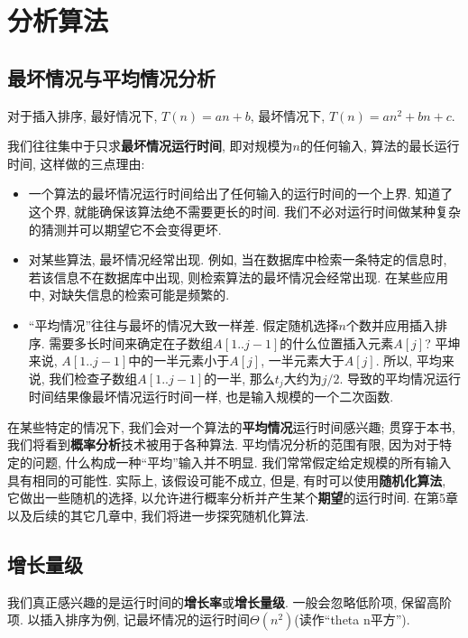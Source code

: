 \documentclass[UTF8,a4paper,zihao=-4,oneside,onecolumn,scheme=chinese,autoindent=true]{ctexbook}
\begin{document}
\section{分析算法}

\subsection*{最坏情况与平均情况分析}

对于插入排序, 最好情况下, $T(n)=an+b$, 最坏情况下, $T(n)=an^2+bn+c$.

我们往往集中于只求\textbf{最坏情况运行时间}, 即对规模为$n$的任何输入, 算法的最长运行时间, 这样做的三点理由:
\begin{itemize}
    \item 一个算法的最坏情况运行时间给出了任何输入的运行时间的一个上界. 知道了这个界, 就能确保该算法绝不需要更长的时间. 我们不必对运行时间做某种复杂的猜测并可以期望它不会变得更坏.
    \item 对某些算法, 最坏情况经常出现. 例如, 当在数据库中检索一条特定的信息时, 若该信息不在数据库中出现, 则检索算法的最坏情况会经常出现. 在某些应用中, 对缺失信息的检索可能是频繁的.
    \item “平均情况”往往与最坏的情况大致一样差. 假定随机选择$n$个数并应用插入排序. 需要多长时间来确定在子数组$A[1..j-1]$的什么位置插入元素$A[j]$? 平坤来说, $A[1..j-1]$中的一半元素小于$A[j]$, 一半元素大于$A[j]$. 所以, 平均来说, 我们检查子数组$A[1..j-1]$的一半, 那么$t_{j}$大约为$j/2$. 导致的平均情况运行时间结果像最坏情况运行时间一样, 也是输入规模的一个二次函数.
\end{itemize}

在某些特定的情况下, 我们会对一个算法的\textbf{平均情况}运行时间感兴趣; 贯穿于本书, 我们将看到\textbf{概率分析}技术被用于各种算法. 平均情况分析的范围有限, 因为对于特定的问题, 什么构成一种“平均”输入并不明显. 我们常常假定给定规模的所有输入具有相同的可能性. 实际上, 该假设可能不成立, 但是, 有时可以使用\textbf{随机化算法}, 它做出一些随机的选择, 以允许进行概率分析并产生某个\textbf{期望}的运行时间. 在第5章以及后续的其它几章中, 我们将进一步探究随机化算法.

\subsection*{增长量级}

我们真正感兴趣的是运行时间的\textbf{增长率}或\textbf{增长量级}. 一般会忽略低阶项, 保留高阶项. 以插入排序为例, 记最坏情况的运行时间$\Theta(n^2)$(读作“theta n平方”).
\end{document}
